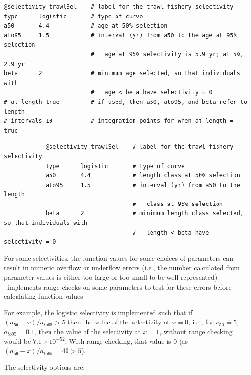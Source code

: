 \ifAgeBased
{\small{\begin{verbatim}
@selectivity trawlSel    # label for the trawl fishery selectivity
type      logistic       # type of curve
a50       4.4            # age at 50% selection
ato95     1.5            # interval (yr) from a50 to the age at 95% selection
                         #   age at 95% selectivity is 5.9 yr; at 5%, 2.9 yr
beta      2              # minimum age selected, so that individuals with 
                         #   age < beta have selectivity = 0
# at_length true         # if used, then a50, ato95, and beta refer to length
# intervals 10			 # integration points for when at_length = true
\end{verbatim}}}
\else
{\small{\begin{verbatim}
			@selectivity trawlSel    # label for the trawl fishery selectivity
			type      logistic       # type of curve
			a50       4.4            # length class at 50% selection
			ato95     1.5            # interval (yr) from a50 to the length
			                         #   class at 95% selection
			beta      2              # minimum length class selected, so that individuals with 
			                         #   length < beta have selectivity = 0
\end{verbatim}}}
\fi

For some selectivities, the function values for some choices of parameters can result in numeric overflow or underflow errors (i.e., the number calculated from parameter values is either too large or too small to be well represented). \CNAME\ implements range checks on some parameters to test for these errors before calculating function values.

For example, the logistic selectivity is implemented such that if $(a_{50}-x)/a_{to95} > 5$ then the value of the selectivity at $x=0$, i.e., for $a_{50}=5$, $a_{to95}=0.1$, then the value of the selectivity at $x=1$, without range checking would be $7.1 \times 10^{-52}$. With range checking, that value is $0$ (as $(a_{50}-x)/a_{to95}=40 > 5$).

The selectivity options are:

